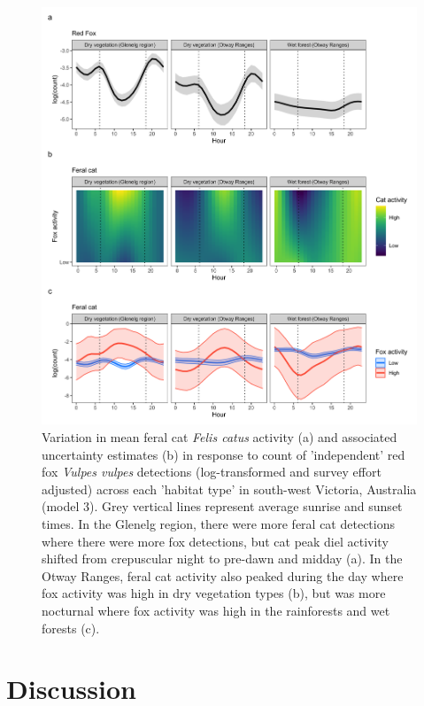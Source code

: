 \documentclass[11pt,a4paper,titlepage,twoside,openright]{style/unimelbthesis}
\begin{document}
\begin{mainmatter}
\begin{figure}
{\centering \includegraphics[width=1\linewidth]{figure/cat_fox_count} 

}

\caption{Variation in mean feral cat \textit{Felis catus} activity (a) and associated uncertainty estimates (b) in response to count of ’independent’ red fox \textit{Vulpes vulpes} detections (log-transformed and survey effort adjusted) across each ’habitat type’ in south-west Victoria, Australia (model 3). Grey vertical lines represent average sunrise and sunset times. In the Glenelg region, there were more feral cat detections where there were more fox detections, but cat peak diel activity shifted from crepuscular night to pre-dawn and midday (a). In the Otway Ranges, feral cat activity also peaked during the day where fox activity was high in dry vegetation types (b), but was more nocturnal where fox activity was high in the rainforests and wet forests (c).}\label{fig:diel-cat-fox}
\end{figure}
\newpage

\hypertarget{discussion-3}{%
\section{Discussion}\label{discussion-3}}


\end{mainmatter}
\end{document}
